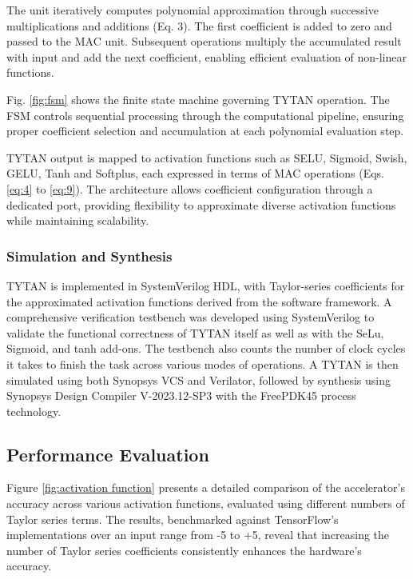 \documentclass[runningheads]{llncs}
\begin{document}
    The unit iteratively computes polynomial approximation through successive multiplications and additions (Eq. 3). The first coefficient is added to zero and passed to the MAC unit. Subsequent operations multiply the accumulated result with input and add the next coefficient, enabling efficient evaluation of non-linear functions.
        
    Fig. \ref{fig:fsm} shows the finite state machine governing TYTAN operation. The FSM controls sequential processing through the computational pipeline, ensuring proper coefficient selection and accumulation at each polynomial evaluation step.
        
    TYTAN output is mapped to activation functions such as SELU, Sigmoid, Swish, GELU, Tanh and Softplus, each expressed in terms of MAC operations (Eqs. \ref{eq:4} to \ref{eq:9}). The architecture allows coefficient configuration through a dedicated port, providing flexibility to approximate diverse activation functions while maintaining scalability.
    
\subsubsection{Simulation and Synthesis}
    TYTAN is implemented in SystemVerilog HDL, with Taylor-series coefficients for the approximated activation functions derived from the software framework. A comprehensive verification testbench was developed using SystemVerilog to validate the functional correctness of TYTAN itself as well as with the SeLu, Sigmoid, and tanh add-ons. The testbench also counts the number of clock cycles it takes to finish the task across various modes of operations. A TYTAN is then simulated using both Synopsys VCS and Verilator, followed by synthesis using Synopsys Design Compiler V-2023.12-SP3 with the FreePDK45 process technology.
    
\subsection{Performance Evaluation}

    Figure \ref{fig:activation function} presents a detailed comparison of the accelerator's accuracy across various activation functions, evaluated using different numbers of Taylor series terms. The results, benchmarked against TensorFlow's implementations over an input range from -5 to +5, reveal that increasing the number of Taylor series coefficients consistently enhances the hardware's accuracy. 
\end{document}
